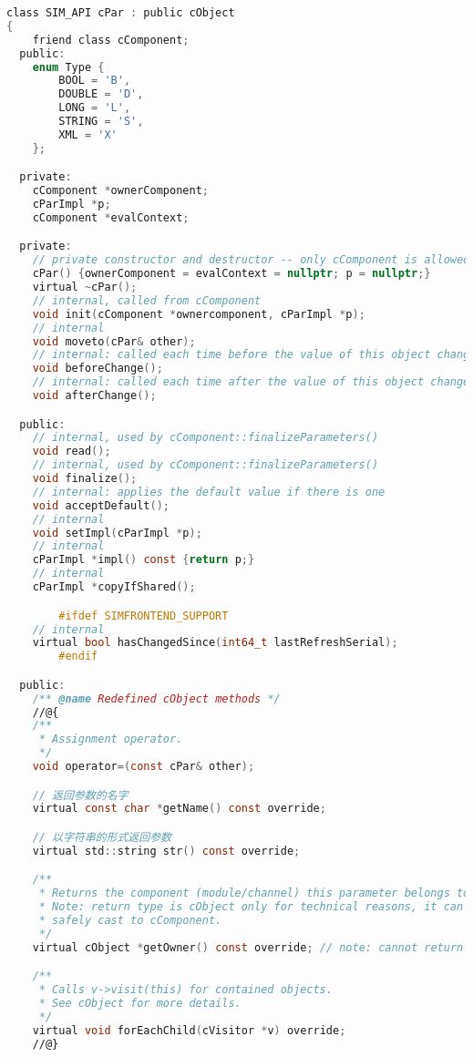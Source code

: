 \begin{lstlisting}[language=c]
class SIM_API cPar : public cObject
{
    friend class cComponent;
  public:
    enum Type {
        BOOL = 'B',
        DOUBLE = 'D',
        LONG = 'L',
        STRING = 'S',
        XML = 'X'
    };

  private:
    cComponent *ownerComponent;
    cParImpl *p;
    cComponent *evalContext;

  private:
    // private constructor and destructor -- only cComponent is allowed to create parameters
    cPar() {ownerComponent = evalContext = nullptr; p = nullptr;}
    virtual ~cPar();
    // internal, called from cComponent
    void init(cComponent *ownercomponent, cParImpl *p);
    // internal
    void moveto(cPar& other);
    // internal: called each time before the value of this object changes.
    void beforeChange();
    // internal: called each time after the value of this object changes.
    void afterChange();

  public:
    // internal, used by cComponent::finalizeParameters()
    void read();
    // internal, used by cComponent::finalizeParameters()
    void finalize();
    // internal: applies the default value if there is one
    void acceptDefault();
    // internal
    void setImpl(cParImpl *p);
    // internal
    cParImpl *impl() const {return p;}
    // internal
    cParImpl *copyIfShared();

        #ifdef SIMFRONTEND_SUPPORT
    // internal
    virtual bool hasChangedSince(int64_t lastRefreshSerial);
        #endif

  public:
    /** @name Redefined cObject methods */
    //@{
    /**
     * Assignment operator.
     */
    void operator=(const cPar& other);

    // 返回参数的名字
    virtual const char *getName() const override;

    // 以字符串的形式返回参数
    virtual std::string str() const override;

    /**
     * Returns the component (module/channel) this parameter belongs to.
     * Note: return type is cObject only for technical reasons, it can be
     * safely cast to cComponent.
     */
    virtual cObject *getOwner() const override; // note: cannot return cComponent* (covariant return type) due to declaration order

    /**
     * Calls v->visit(this) for contained objects.
     * See cObject for more details.
     */
    virtual void forEachChild(cVisitor *v) override;
    //@}


\end{lstlisting}
